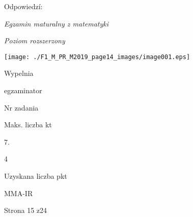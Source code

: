\documentclass[a4paper,12pt]{article}
\begin{document}
Odpowiedzí:

{\it Egzamin maturalny z matematyki}

{\it Poziom rozszerzony}
\begin{center}
\texttt{[image: ./F1\_M\_PR\_M2019\_page14\_images/image001.eps]}
\end{center}
Wypelnia

egzaminator

Nr zadania

Maks. liczba kt

7.

4

Uzyskana liczba pkt

MMA-IR

Strona 15 z24
\end{document}
